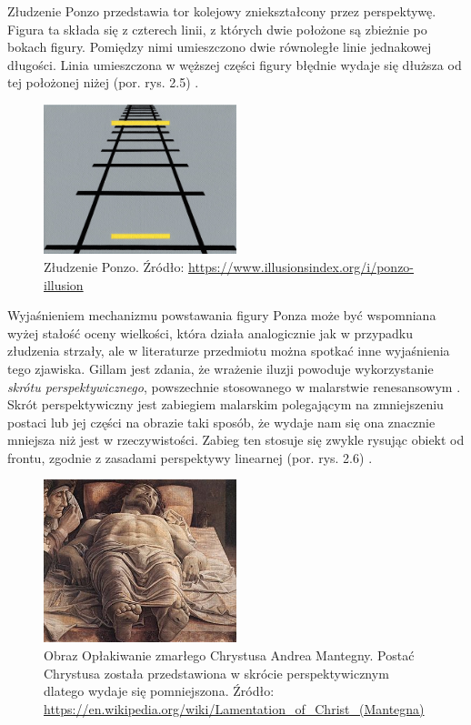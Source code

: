 \documentclass[licencjacka]{kdypl}
\begin{document}
Złudzenie Ponzo przedstawia tor kolejowy zniekształcony przez perspektywę. Figura ta składa się z czterech linii, z których dwie położone są zbieżnie po bokach figury. Pomiędzy nimi umieszczono dwie równoległe linie jednakowej długości. Linia umieszczona w węższej części figury błędnie wydaje się dłuższa od tej położonej niżej (por. rys. 2.5) \citep[s. 163]{Gregory}. 

\begin{figure}[H]
\includegraphics[width=0.5\textwidth]{ponzo.jpg}
\centering
\caption{Złudzenie Ponzo. Źródło: \url{https://www.illusionsindex.org/i/ponzo-illusion}}
\end{figure}

Wyjaśnieniem mechanizmu powstawania figury Ponza może być wspomniana wyżej stałość oceny wielkości, która działa analogicznie jak w przypadku złudzenia strzały, ale w literaturze przedmiotu można spotkać inne wyjaśnienia tego zjawiska. Gillam jest zdania, że wrażenie iluzji powoduje wykorzystanie \textit{skrótu perspektywicznego}, powszechnie stosowanego w malarstwie renesansowym \citep{Gillam1973}. Skrót perspektywiczny jest zabiegiem malarskim polegającym na zmniejszeniu postaci lub jej części na obrazie taki sposób, że wydaje nam się ona znacznie mniejsza niż jest w rzeczywistości. Zabieg ten stosuje się zwykle rysując obiekt od frontu, zgodnie z zasadami perspektywy linearnej (por. rys. 2.6) \citep[s. 382]{slownik}. 

\begin{figure}[H]
\includegraphics[width=0.5\textwidth]{chrystus.jpg}
\centering
\caption{Obraz Opłakiwanie zmarłego Chrystusa Andrea Mantegny. Postać Chrystusa została przedstawiona w skrócie perspektywicznym dlatego wydaje się pomniejszona. Źródło: \url{https://en.wikipedia.org/wiki/Lamentation_of_Christ_(Mantegna)}}
\end{figure}
\end{document}
